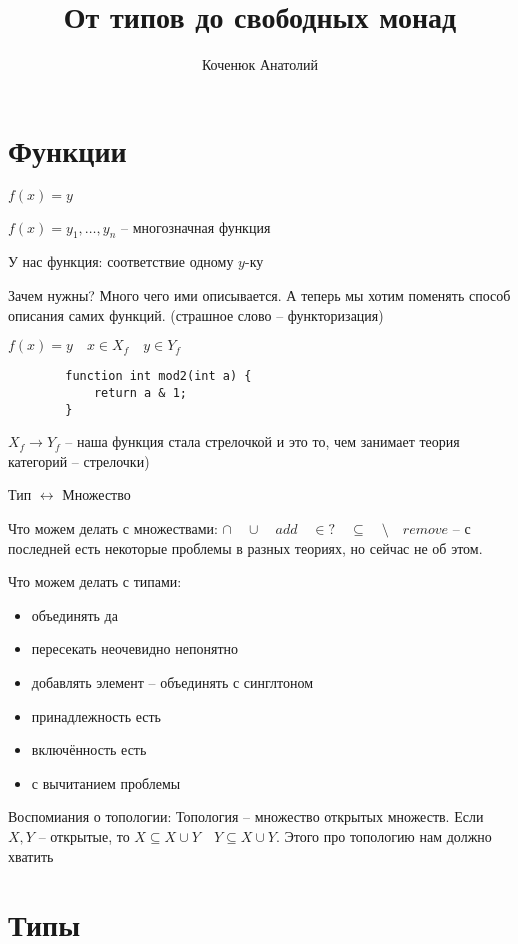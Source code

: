 \documentclass{book}
\author{Коченюк Анатолий}
\title{От типов до свободных монад}
\theoremstyle{definition}
\begin{document}
    \maketitle
    \section{Функции}

    $f(x) = y$

    $f(x) = y_1, \ldots, y_n$ -- многозначная функция

    У нас функция: соответствие одному $y$-ку

    Зачем нужны? Много чего ими описывается. А теперь мы хотим поменять способ описания самих функций. (страшное слово -- функторизация)

    $f(x) = y \quad x\in X_f\quad y\in Y_f$

    \begin{lstlisting}
        function int mod2(int a) {
            return a & 1;
        }   
    \end{lstlisting}

    $X_f \to Y_f$ -- наша функция стала стрелочкой и это то, чем занимает теория категорий -- стрелочки)
    
    Тип $ \leftrightarrow$ Множество

    Что можем делать с множествами:  $\cap\quad \cup\quad add\quad \in?\quad \subseteq \quad \setminus \quad remove$ -- с последней есть некоторые проблемы в разных теориях, но сейчас не об этом.

    Что можем делать с типами:
    \begin{itemize}
        \item объединять да
        \item пересекать неочевидно непонятно
        \item добавлять элемент -- объединять с синглтоном
        \item принадлежность есть
        \item включённость есть
        \item с вычитанием проблемы
    \end{itemize}

    Воспомиания о топологии: Топология -- множество открытых множеств. Если $X, Y$ -- открытые, то  $X\subseteq  X\cup Y\quad Y\subseteq X\cup Y$. Этого про топологию нам должно хватить

    \section{Типы}
\end{document}
